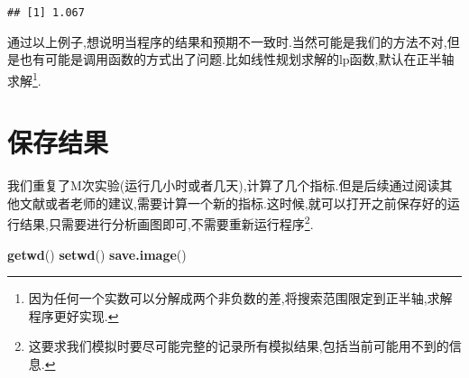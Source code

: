 \documentclass[]{ctexbook}
\newenvironment{Shaded}{\begin{snugshade}}{\end{snugshade}}
\newcommand{\DataTypeTok}[1]{\textcolor[rgb]{0.13,0.29,0.53}{#1}}
\newcommand{\DecValTok}[1]{\textcolor[rgb]{0.00,0.00,0.81}{#1}}
\newcommand{\FloatTok}[1]{\textcolor[rgb]{0.00,0.00,0.81}{#1}}
\newcommand{\KeywordTok}[1]{\textcolor[rgb]{0.13,0.29,0.53}{\textbf{#1}}}
\newcommand{\NormalTok}[1]{#1}
\newcommand{\OperatorTok}[1]{\textcolor[rgb]{0.81,0.36,0.00}{\textbf{#1}}}
\newcommand{\StringTok}[1]{\textcolor[rgb]{0.31,0.60,0.02}{#1}}
\begin{document}
\begin{Shaded}
\end{Shaded}

\begin{verbatim}
## [1] 1.067
\end{verbatim}

通过以上例子,想说明当程序的结果和预期不一致时.当然可能是我们的方法不对,但是也有可能是调用函数的方式出了问题.比如线性规划求解的lp函数,默认在正半轴求解\footnote{因为任何一个实数可以分解成两个非负数的差,将搜索范围限定到正半轴,求解程序更好实现.}.

\hypertarget{section-6}{%
\section{保存结果}\label{section-6}}

我们重复了M次实验(运行几小时或者几天),计算了几个指标.但是后续通过阅读其他文献或者老师的建议,需要计算一个新的指标.这时候,就可以打开之前保存好的运行结果,只需要进行分析画图即可,不需要重新运行程序\footnote{这要求我们模拟时要尽可能完整的记录所有模拟结果,包括当前可能用不到的信息.}.

\begin{Shaded}
\begin{Highlighting}[]
\KeywordTok{getwd}\NormalTok{()}
\KeywordTok{setwd}\NormalTok{()}
\KeywordTok{save.image}\NormalTok{()}
\end{Highlighting}
\end{Shaded}
\end{document}
